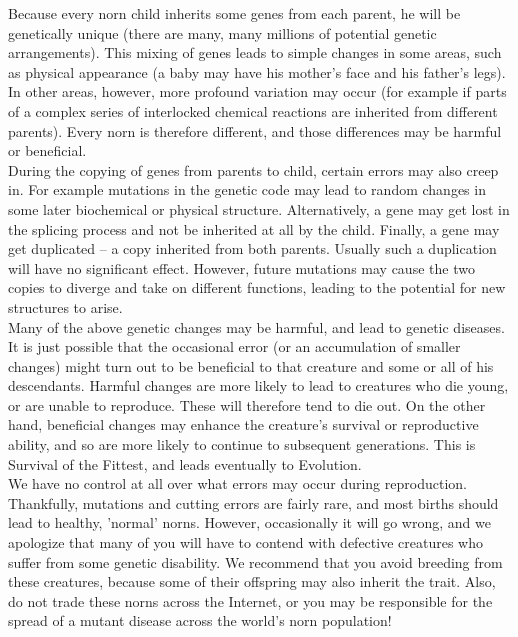 \documentclass[11pt,twoside,a4paper]{article}
\begin{document}
Because every norn child inherits some genes from each parent, he will be genetically unique (there are many, many millions of potential genetic arrangements). This mixing of genes leads to simple changes in some areas, such as physical appearance (a baby may have his mother's face and his father's legs). In other areas, however, more profound variation may occur (for example if parts of a complex series of interlocked chemical reactions are inherited from different parents). Every norn is therefore different, and those differences may be harmful or beneficial. ~\\

During the copying of genes from parents to child, certain errors may also creep in. For example mutations in the genetic code may lead to random changes in some later biochemical or physical structure. Alternatively, a gene may get lost in the splicing process and not be inherited at all by the child. Finally, a gene may get duplicated -- a copy inherited from both parents. Usually such a duplication will have no significant effect. However, future mutations may cause the two copies to diverge and take on different functions, leading to the potential for new structures to arise. ~\\

Many of the above genetic changes may be harmful, and lead to genetic diseases. It is just possible that the occasional error (or an accumulation of smaller changes) might turn out to be beneficial to that creature and some or all of his descendants. Harmful changes are more likely to lead to creatures who die young, or are unable to reproduce. These will therefore tend to die out. On the other hand, beneficial changes may enhance the creature's survival or reproductive ability, and so are more likely to continue to subsequent generations. This is Survival of the Fittest, and leads eventually to Evolution. ~\\

We have no control at all over what errors may occur during reproduction. Thankfully, mutations and cutting errors are fairly rare, and most births should lead to healthy, 'normal' norns. However, occasionally it will go wrong, and we apologize that many of you will have to contend with defective creatures who suffer from some genetic disability. We recommend that you avoid breeding from these creatures, because some of their offspring may also inherit the trait. Also, do not trade these norns across the Internet, or you may be responsible for the spread of a mutant disease across the world's norn population! ~\\
\end{document}
